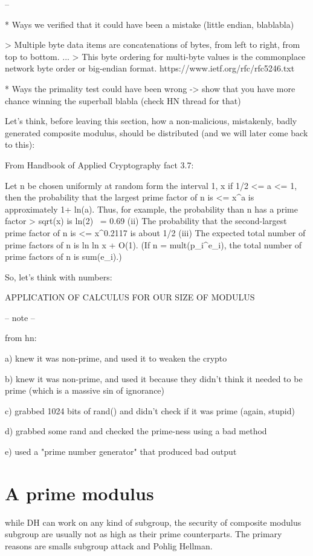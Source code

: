 \documentclass[a4paper,11pt]{article}
\begin{document}
--

* Ways we verified that it could have been a mistake (little endian, blablabla)

> Multiple byte data
   items are concatenations of bytes, from left to right, from top to
   bottom.
   ...
> This byte ordering for multi-byte values is the commonplace network
   byte order or big-endian format.
   https://www.ietf.org/rfc/rfc5246.txt

* Ways the primality test could have been wrong -> show that you have more chance winning the superball blabla (check HN thread for that)

Let's think, before leaving this section, how a non-malicious, mistakenly, badly generated composite modulus, should be distributed (and we will later come back to this):

From Handbook of Applied Cryptography fact 3.7:

    Let n be chosen uniformly at random form the interval 1, x if 1/2 <= a <= 1, then the probability that the largest prime factor of n is <= x^a is approximately 1+ ln(a). Thus, for example, the probability than n has a prime factor > sqrt(x) is ln(2) ~= 0.69 (ii) The probability that the second-largest prime factor of n is <= x^{0.2117} is about 1/2 (iii) The expected total number of prime factors of n is ln ln x + O(1). (If n = mult(p_i^{e_i}), the total number of prime factors of n is sum(e_i).)

So, let's think with numbers:

APPLICATION OF CALCULUS FOR OUR SIZE OF MODULUS


-- note --

from hn:


a) knew it was non-prime, and used it to weaken the crypto

b) knew it was non-prime, and used it because they didn't think it needed to be prime (which is a massive sin of ignorance)

c) grabbed 1024 bits of rand() and didn't check if it was prime (again, stupid)

d) grabbed some rand and checked the prime-ness using a bad method

e) used a "prime number generator" that produced bad output


\section{A prime modulus}

while DH can work on any kind of subgroup, the security of composite modulus subgroup are usually not as high as their prime counterparts. The primary reasons are smalls subgroup attack and Pohlig Hellman.
\end{document}
